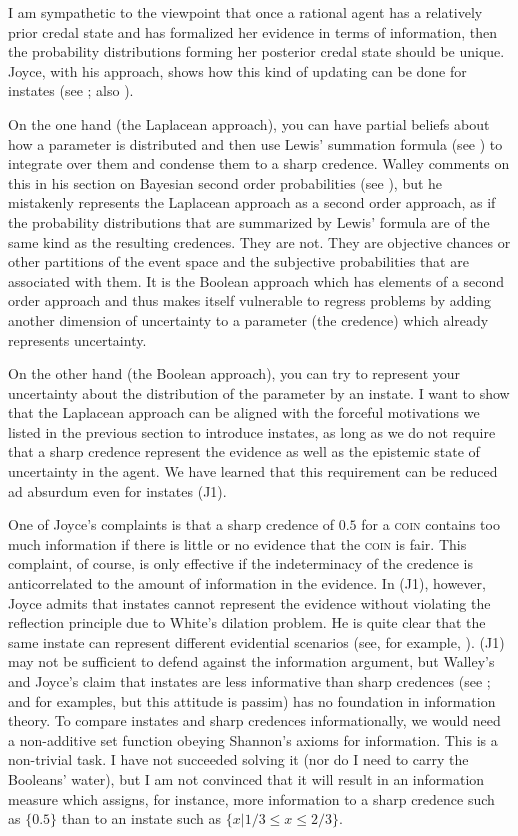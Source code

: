 \documentclass[11pt]{article}
\begin{document}
I am sympathetic to the viewpoint that once a rational agent has a
relatively prior credal state and has formalized her evidence in terms
of information, then the probability distributions forming her
posterior credal state should be unique. Joyce, with his
 approach, shows how this kind of updating can
be done for instates (see ; also
).

On the one hand (the Laplacean approach), you can have partial beliefs
about how a parameter is distributed and then use Lewis' summation
formula (see ) to integrate over them and
condense them to a sharp credence. Walley comments on this
 in his section on Bayesian second order
probabilities (see ), but he mistakenly
represents the Laplacean approach as a second order approach, as if
the probability distributions that are summarized by Lewis' formula
are of the same kind as the resulting credences. They are not. They
are objective chances or other partitions of the event space and the
subjective probabilities that are associated with them. It is the
Boolean approach which has elements of a second order approach and
thus makes itself vulnerable to regress problems by adding another
dimension of uncertainty to a parameter (the credence) which already
represents uncertainty.

On the other hand (the Boolean approach), you can try to represent
your uncertainty about the distribution of the parameter by an
instate. I want to show that the Laplacean approach can be aligned
with the forceful motivations we listed in the previous section to
introduce instates, as long as we do not require that a sharp credence
represent the evidence as well as the epistemic state of uncertainty
in the agent. We have learned that this requirement can be reduced ad
absurdum even for instates (J1).

One of Joyce's complaints is that a sharp credence of $0.5$ for a
\textsc{coin} contains too much information if there is little or no
evidence that the \textsc{coin} is fair. This complaint, of course, is
only effective if the indeterminacy of the credence is anticorrelated
to the amount of information in the evidence. In (J1), however, Joyce
admits that instates cannot represent the evidence without violating
the reflection principle due to White's dilation problem. He is quite
clear that the same instate can represent different evidential
scenarios (see, for example, ). (J1) may not be
sufficient to defend against the information argument, but Walley's
and Joyce's claim that instates are less informative than sharp
credences (see ; and 
for examples, but this attitude is passim) has no foundation in
information theory. To compare instates and sharp credences
informationally, we would need a non-additive set function obeying
Shannon's axioms for information. This is a non-trivial task. I have
not succeeded solving it (nor do I need to carry the Booleans' water),
but I am not convinced that it will result in an information measure
which assigns, for instance, more information to a sharp credence such
as $\{0.5\}$ than to an instate such as $\{x|1/3\leq{}x\leq{}2/3\}$.
\end{document}
